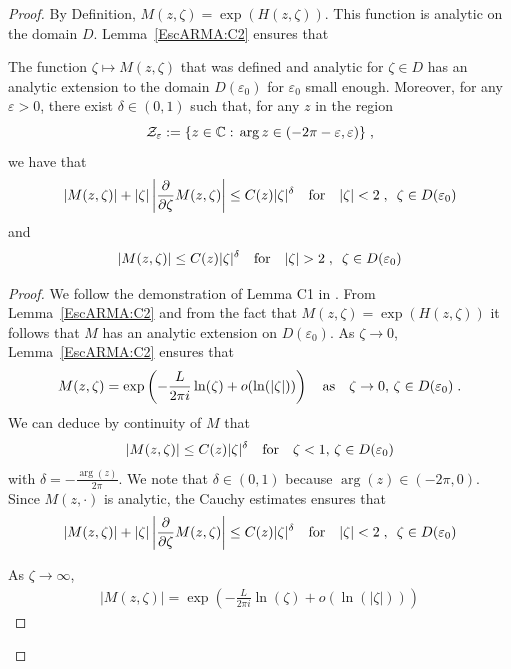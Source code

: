\documentclass[11pt]{amsart}
\begin{document}
\begin{proof}
By Definition, $ M(z, \zeta) = \exp(H(z, \zeta))$. This function is analytic on the domain $D$. Lemma~\ref{EscARMA:C2} ensures that

\begin{lemma}\label{prop:cptM}The function $\zeta \mapsto M(z,\zeta)$ that was defined and analytic for $\zeta \in D$ has an analytic extension to the domain $D(\varepsilon_0)$ for $\varepsilon_0$ small enough. Moreover, for any $\varepsilon > 0$, there exist $\delta \in (0,1)$ such that, for any $z$ in the region
    $$ \mathcal{Z}_\varepsilon := \{ z \in \mathbb{C} :\, \arg z \in (-2\pi-\varepsilon, \varepsilon)\} \; ,$$ we have that 
    \begin{equation}
        |M(z, \zeta)| + |\zeta|\left| \frac{\partial}{\partial \zeta}M(z,\zeta)\right|
        \leq 
        C(z) |\zeta|^\delta \quad \text{for} \quad |\zeta| < 2 \; , \enspace \zeta \in D(\varepsilon_0)
    \end{equation}
    and 
    \begin{equation}
        |M(z,\zeta)| \leq C(z)|\zeta|^{\delta} \quad \text{for} \quad |\zeta| > 2 \; , \enspace \zeta \in D(\varepsilon_0)
    \end{equation}
\end{lemma}
\begin{proof}We follow the demonstration of Lemma C1 in \cite{escobedo2007fundamental}. From Lemma~\ref{EscARMA:C2} and from the fact that $M(z, \zeta) = \exp(H(z,\zeta))$ it follows that $M$ has an analytic extension on $D(\varepsilon_0)$.
As $\zeta \to 0$, Lemma~\ref{EscARMA:C2} ensures that 
$$ M(z, \zeta) = \exp\left(-\frac{L}{2\pi i} \ln(\zeta) + o(\ln(|\zeta|)) \right)  \quad \text{as} \quad \zeta\to 0,\, \zeta \in D(\varepsilon_0) \; .$$
We can deduce by continuity of $M$ that 
$$|M(z, \zeta)| \leq C(z)|\zeta|^\delta
\quad \text{for} \quad  \zeta < 1,\, \zeta \in D(\varepsilon_0)$$ with 
 $\delta = -\frac{\arg(z)}{2\pi}$. We note that $\delta \in (0,1)$ because $\arg(z) \in (-2\pi, 0)$.
Since $M(z, \cdot)$ is analytic, the Cauchy estimates ensures that 
\begin{equation*}
    |M(z, \zeta)| + |\zeta|\left| \frac{\partial}{\partial \zeta}M(z,\zeta)\right|
    \leq 
    C(z) |\zeta|^\delta \quad \text{for} \quad |\zeta| < 2 \; , \enspace \zeta \in D(\varepsilon_0)
\end{equation*}

As $\zeta \to \infty$, 
\begin{align*}
    |M(z, \zeta)| 
    = 
    \exp\left(-\frac{L}{2\pi i} \ln(\zeta) + o(\ln(|\zeta|)) \right)  
\end{align*}
\end{proof}


\end{proof}
\end{document}
